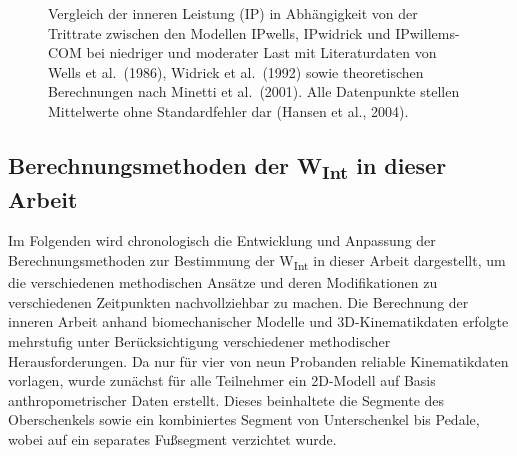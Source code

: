 \documentclass[
  letterpaper,
  DIV=11]{scrartcl}
\begin{document}
\begin{figure}


\caption{\label{fig-Modellverlgeich_2}Vergleich der inneren Leistung
(IP) in Abhängigkeit von der Trittrate zwischen den Modellen IPwells,
IPwidrick und IPwillems-COM bei niedriger und moderater Last mit
Literaturdaten von Wells et al.~(1986), Widrick et al.~(1992) sowie
theoretischen Berechnungen nach Minetti et al.~(2001). Alle Datenpunkte
stellen Mittelwerte ohne Standardfehler dar (Hansen et al., 2004).}

\end{figure}%

\subsection{\texorpdfstring{Berechnungsmethoden der W\textsubscript{Int}
in dieser
Arbeit}{Berechnungsmethoden der WInt in dieser Arbeit}}\label{berechnungsmethoden-der-wint-in-dieser-arbeit}

Im Folgenden wird chronologisch die Entwicklung und Anpassung der
Berechnungsmethoden zur Bestimmung der W\textsubscript{Int} in dieser
Arbeit dargestellt, um die verschiedenen methodischen Ansätze und deren
Modifikationen zu verschiedenen Zeitpunkten nachvollziehbar zu machen.
Die Berechnung der inneren Arbeit anhand biomechanischer Modelle und
3D-Kinematikdaten erfolgte mehrstufig unter Berücksichtigung
verschiedener methodischer Herausforderungen. Da nur für vier von neun
Probanden reliable Kinematikdaten vorlagen, wurde zunächst für alle
Teilnehmer ein 2D-Modell auf Basis anthropometrischer Daten erstellt.
Dieses beinhaltete die Segmente des Oberschenkels sowie ein kombiniertes
Segment von Unterschenkel bis Pedale, wobei auf ein separates Fußsegment
verzichtet wurde.
\end{document}
